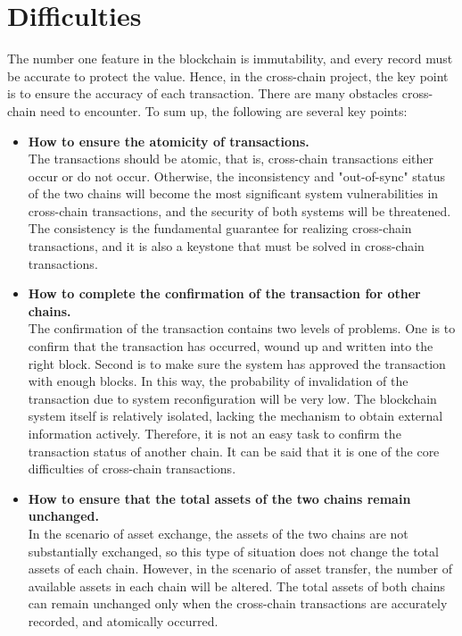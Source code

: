 \section{Difficulties}
\label{sec:diff}
\noindent The number one feature in the blockchain is immutability, and every record must be accurate to protect the value. Hence, in the cross-chain project, the key point is to ensure the accuracy of each transaction. There are many obstacles cross-chain need to encounter. To sum up, the following are several key points:\\


\begin{itemize}
    \item \textbf{How to ensure the atomicity of transactions.}\\
    The transactions should be atomic, that is, cross-chain transactions either occur or do not occur. Otherwise, the inconsistency and "out-of-sync" status of the two chains will become the most significant system vulnerabilities in cross-chain transactions, and the security of both systems will be threatened. The consistency is the fundamental guarantee for realizing cross-chain transactions, and it is also a keystone that must be solved in cross-chain transactions.
    \item \textbf{How to complete the confirmation of the transaction for other chains.} \\
    The confirmation of the transaction contains two levels of problems. One is to confirm that the transaction has occurred, wound up and written into the right block. Second is to make sure the system has approved the transaction with enough blocks. In this way, the probability of invalidation of the transaction due to system reconfiguration will be very low. The blockchain system itself is relatively isolated, lacking the mechanism to obtain external information actively. Therefore, it is not an easy task to confirm the transaction status of another chain. It can be said that it is one of the core difficulties of cross-chain transactions.
    \item \textbf{How to ensure that the total assets of the two chains remain unchanged.} \\
    In the scenario of asset exchange, the assets of the two chains are not substantially exchanged, so this type of situation does not change the total assets of each chain. However, in the scenario of asset transfer, the number of available assets in each chain will be altered. The total assets of both chains can remain unchanged only when the cross-chain transactions are accurately recorded, and atomically occurred. 

\end{itemize}
